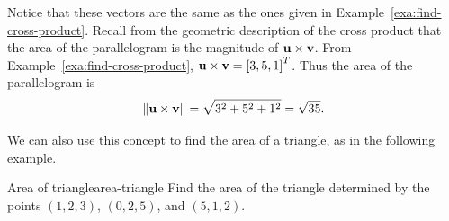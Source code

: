 \begin{solution}
  Notice that these vectors are the same as the ones given in Example~\ref{exa:find-cross-product}.  Recall from the geometric description
  of the cross product that the area of the parallelogram is the
  magnitude of $\mbox{\bf u} \times \mbox{\bf v}$.  From
  Example~\ref{exa:find-cross-product},
  $\mbox{\bf u} \times \mbox{\bf v} = \left[3,5,1\right]^T$.
  Thus the area of the parallelogram is
  \begin{equation*}
    \left\|\mbox{\bf u} \times \mbox{\bf v}\right\| =
    \sqrt{3^2+5^2+1^2} = \sqrt{35}.
  \end{equation*}
\end{solution}

We can also use this concept to find the area of a triangle, as in the
following example.

\begin{example}{Area of triangle}{area-triangle}
  Find the area of the triangle determined by the points
  $(1,2,3)$, $(0,2,5)$, and $(5,1,2)$.
\end{example}

